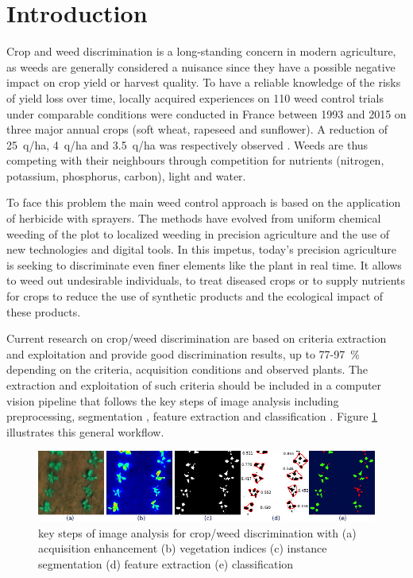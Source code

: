 \documentclass[../thesis.tex]{subfiles}
\begin{document}
	\newpage
    \section{Introduction}
    
   	Crop and weed discrimination is a long-standing concern in modern agriculture, as weeds are generally considered a nuisance since they have a possible negative impact on crop yield or harvest quality. To have a reliable knowledge of the risks of yield loss over time, locally acquired experiences on 110 weed control trials under comparable conditions were conducted in France between 1993 and 2015 on three major annual crops (soft wheat, rapeseed and sunflower). A reduction of \SI{25}{q/ha}, \SI{4}{q/ha} and \SI{3.5}{q/ha} was respectively observed \cite{cordeau2016nuisibilite}. Weeds are thus competing with their neighbours through competition for nutrients (nitrogen, potassium, phosphorus, carbon), light and water.
    
    To face this problem the main weed control approach is based on the application of herbicide with sprayers. The methods have evolved from uniform chemical weeding of the plot to localized weeding in precision agriculture and the use of new technologies and digital tools. In this impetus, today's precision agriculture is seeking to discriminate even finer elements like the plant in real time. It allows to weed out undesirable individuals, to treat diseased crops or to supply nutrients for crops to reduce the use of synthetic products and the ecological impact of these products.
    
    Current research on crop/weed discrimination are based on criteria extraction and exploitation and provide good discrimination results, up to 77-\SI{97}{\percent} \cite{Ahmed2016} depending on the criteria, acquisition conditions and observed plants. The extraction and exploitation of such criteria should be included in a computer vision pipeline that follows the key steps of image analysis including preprocessing, segmentation \cite{vayssade2022}, feature extraction and classification \cite{pmid29048559}. Figure \ref{fig:pipeline-sub} illustrates this general workflow.
    
    \begin{figure}[H]
        \centering
        \includegraphics[width=\linewidth]{img/features/pipeline-sub}
        \caption{key steps of image analysis for crop/weed discrimination with (a) acquisition enhancement (b) vegetation indices (c) instance segmentation (d) feature extraction (e) classification}
        \label{fig:pipeline-sub}
    \end{figure}
    
\end{document}
